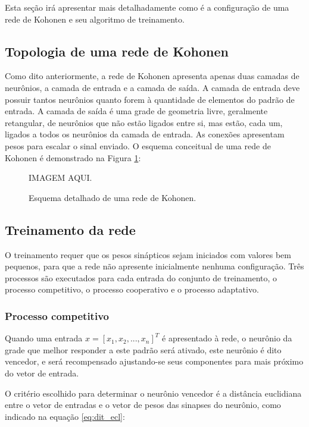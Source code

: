 Esta seção irá apresentar mais detalhadamente como é a configuração de uma rede
de Kohonen e seu algoritmo de treinamento.

\subsection{Topologia de uma rede de Kohonen}

Como dito anteriormente, a rede de Kohonen apresenta apenas duas camadas de
neurônios, a camada de entrada e a camada de saída. A camada de entrada deve
possuir tantos neurônios quanto forem à quantidade de elementos do padrão de
entrada. A camada de saída é uma grade de geometria livre, geralmente
retangular, de neurônios que não estão ligados entre si, mas estão, cada um,
ligados a todos os neurônios da camada de entrada. As conexões apresentam pesos
para escalar o sinal enviado. O esquema conceitual de uma rede de Kohonen é
demonstrado na Figura \ref{fig:kohonen_esquema}:

\begin{figure}[H]
  \begin{center}
    IMAGEM AQUI.
  \end{center}
  \caption{ Esquema detalhado de uma rede de Kohonen. }
  \label{fig:kohonen_esquema}
\end{figure}

\subsection{Treinamento da rede}

O treinamento requer que os pesos sinápticos sejam iniciados com valores bem
pequenos, para que a rede não apresente inicialmente nenhuma configuração. Três
processos são executados para cada entrada do conjunto de treinamento, o
processo competitivo, o processo cooperativo e o processo adaptativo.

\subsubsection{Processo competitivo}

Quando uma entrada $ x = \left[x_1, x_2, ..., x_n\right]^T $ é apresentado à
rede, o neurônio da grade que melhor responder a este padrão será ativado, este
neurônio é dito vencedor, e será recompensado ajustando-se seus componentes
para mais próximo do vetor de entrada.

O critério escolhido para determinar o neurônio vencedor é a distância
euclidiana entre o vetor de entradas e o vetor de pesos das sinapses do
neurônio, como indicado na equação \ref{eq:dit_ecl}:

